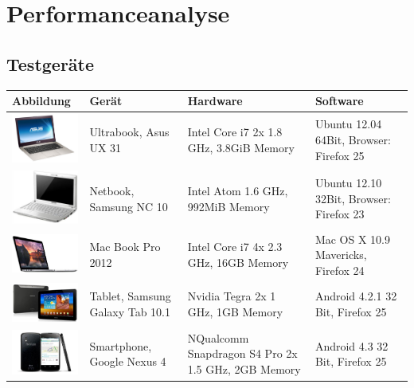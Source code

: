  \chapter{Performanceanalyse}
	\label{performanceanalyse} 

	
	\begin{landscape}
	\section{Testgeräte}
	\begin{tabularx}{1.4\textwidth}{|l|XXX|}
		\hline
		\textbf{Abbildung} & \textbf{Gerät} & \textbf{Hardware} & \textbf{Software}\\
		\hline
		\includegraphics[width=3cm]{../performanceAnalaysis/devices/asusux21.png} & Ultrabook, Asus UX 31 & Intel Core i7 2x 1.8 GHz, 3.8GiB Memory
& Ubuntu 12.04 64Bit, Browser: Firefox 25 \\
		\hline
		\includegraphics[width=3cm]{../performanceAnalaysis/devices/samsungnc10.jpg} & Netbook, Samsung NC 10 & Intel Atom 1.6 GHz, 992MiB Memory & Ubuntu 12.10 32Bit, Browser: Firefox 23 \\
		\hline
		\includegraphics[width=3cm]{../performanceAnalaysis/devices/macbookpro.jpg} & Mac Book Pro 2012 & Intel Core i7 4x 2.3 GHz, 16GB Memory & Mac OS X 10.9 Mavericks, Firefox 24 \\
		\hline
		\includegraphics[width=3cm]{../performanceAnalaysis/devices/samsunggalaxy101.jpg} & Tablet, Samsung Galaxy Tab 10.1 & Nvidia Tegra 2x 1 GHz, 1GB Memory & Android 4.2.1 32 Bit, Firefox 25 \\
		\hline
		\includegraphics[width=3cm]{../performanceAnalaysis/devices/googlenexus4.jpg} & Smartphone, Google Nexus 4 & NQualcomm Snapdragon S4 Pro 2x 1.5 GHz, 2GB Memory & Android 4.3 32 Bit, Firefox 25 \\
		\hline
	\end{tabularx}
	

\end{landscape}
